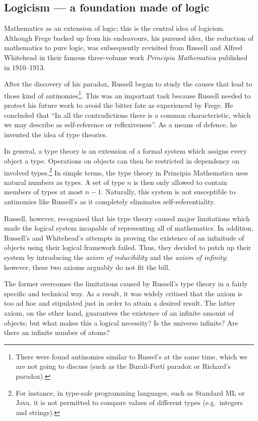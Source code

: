 \documentclass[hidelinks]{article}
\theoremstyle{plain}
\theoremstyle{definition}
\theoremstyle{rem}
\begin{document}
\subsection{Logicism --- a foundation made of logic}
Mathematics as an extension of logic; this is the central idea of logicism. Although Frege backed up from his endeavours, his pursued idea, the reduction of mathematics to pure logic, was subsequently revisited from Russell and Alfred Whitehead in their famous three-volume work \textit{Principia Mathematica} published in 1910--1913.

After the discovery of his paradox, Russell began to study the causes that lead to those kind of antinomies\footnote{There were found antinomies similar to Russel's at the same time, which we are not going to discuss (such as the Burali-Forti paradox or Richard's paradox).\cite{russell_self_referentiality}}. This was an important task because Russell needed to protect his future work to avoid the bitter fate as experienced by Frege. He concluded that ``In all the contradictions there is a common characteristic, which we may describe as self-reference or reflexiveness''\cite[p. 224]{russell_self_referentiality}. As a means of defence, he invented the idea of type theories. 

In general, a type theory is an extension of a formal system which assigns every object a type. Operations on objects can then be restricted in dependency on involved types.\footnote{For instance, in type-safe programming languages, such as Standard ML or Java, it is not permitted to compare values of different types (e.g.\ integers and strings).} In simple terms, the type theory in Principia Mathematica uses natural numbers as types. A set of type $n$ is then only allowed to contain members of types at most $n-1$. Naturally, this system is not susceptible to antinomies like Russell's as it completely eliminates self-referentiality. 

Russell, however, recognised that his type theory caused major limitations which made the logical system incapable of representing all of mathematics. In addition, Russell's and Whitehead's attempts in proving the existence of an infinitude of objects using their logical framework failed. Thus, they decided to patch up their system by introducing the \textit{axiom of reducibility} and the \textit{axiom of infinity}; however, these two axioms arguably do not fit the bill.

The former overcomes the limitations caused by Russell's type theory in a fairly specific and technical way. As a result, it was widely critised that the axiom is too ad hoc and stipulated just in order to attain a desired result.
The latter axiom, on the other hand, guarantees the existence of an infinite amount of objects; but what makes this a logical necessity? Is the universe infinite? Are there an infinite number of atoms?
\end{document}
